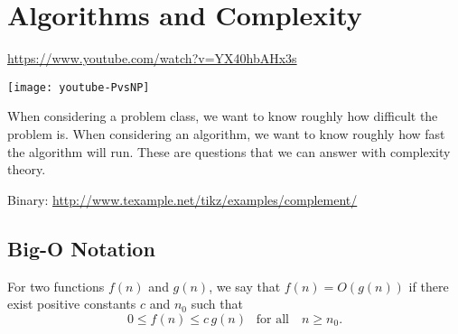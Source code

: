 \documentclass[../open-optimization/open-optimization.tex]{subfiles}
\begin{document}
\chapter{Algorithms and Complexity}
\label{sec:complexity}

\url{https://www.youtube.com/watch?v=YX40hbAHx3s}

\texttt{[image: youtube-PvsNP]}

When considering a problem class, we want to know roughly how difficult the problem is.  
When considering an algorithm, we want to know roughly how fast the algorithm will run.
These are questions that we can answer with complexity theory.

Binary:
\url{http://www.texample.net/tikz/examples/complement/}


%
%

\section{Big-O Notation}

\begin{definition}[Big-O]
For two functions $f(n)$ and $g(n)$, we say that $f(n) = O(g(n))$ if there exist positive constants $c$ and $n_0$ such that 
\begin{equation}
\label{eq:bigO}
0 \leq f(n) \leq c\, g(n) \ \ \text{ for all } \ \ \ n \geq n_0.
\end{equation}
\end{definition}
\end{document}
